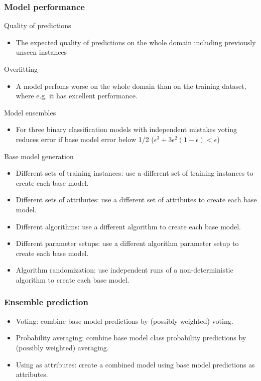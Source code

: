 \documentclass[proffesionalfonts]{beamer}
\begin{document}
\begin{frame}
\frametitle{Model performance}
\begin{block}{Quality of predictions}
\begin{itemize}
\item The expected quality of predictions on the whole domain including previously unseen instances
\end{itemize}
\end{block}
\begin{block}{Overfitting}
\begin{itemize}
\item A model perfoms worse on the whole domain than on the training dataset, where e.g. it has excellent performance.
\end{itemize}
\end{block}
\end{frame}

\begin{frame}
\begin{block}{Model ensembles}
\begin{itemize}
\item For three binary classification models with independent mistakes voting reduces error if base model error below 1/2 ($\epsilon^3+3\epsilon^2(1-\epsilon)<\epsilon$)
\end{itemize}
\end{block}
\begin{block}{Base model generation}
\begin{itemize}
\item Different sets of training instances: use a different set of training instances to create each base model.
\item Different sets of attributes: use a different set of attributes to create each base model.
\item Different algorithms: use a different algorithm to create each base model.
\item Different parameter setups: use a different algorithm parameter setup to create each base model.
\item Algorithm randomization: use independent runs of a non-deterministic algorithm to create each base model.
\end{itemize}
\end{block}
\end{frame}

\begin{frame}
\frametitle{Ensemble prediction}
\begin{block}{}
\begin{itemize}
\item Voting: combine base model predictions by (possibly weighted) voting.
\item Probability averaging: combine base model class probability predictions by (possibly weighted) averaging.
\item Using as attributes: create a combined model using base model predictions as attributes.
\end{itemize}
\end{block}
\end{frame}
\end{document}
